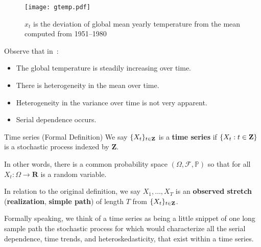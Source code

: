 \begin{figure}[!ht]
    \centering
    \texttt{[image: gtemp.pdf]}
    \caption{$ x_t $ is the deviation of global mean
        yearly temperature from the mean computed from 1951--1980}\label{fig:gtemp}
\end{figure}

Observe that in~:
\begin{itemize}
    \item The global temperature is steadily increasing over time.
    \item There is heterogeneity in the mean over time.
    \item Heterogeneity in the variance over time is not very apparent.
    \item Serial dependence occurs.
\end{itemize}

\begin{Definition}{Time series (Formal Definition)}{}
    We say $ \{X_t\}_{t\in\mathbf{Z}} $
    is a \textbf{time series} if $ \{X_t : t\in\mathbf{Z}\} $
    is a stochastic process indexed by $ \mathbf{Z} $.
\end{Definition}
In other words, there is a common probability space
$ (\Omega,\mathcal{F},\mathbb{P}) $ so that for all
$ X_t:\Omega\to\mathbf{R} $ is a random variable.

In relation to the original definition, we say
$ X_1,\ldots,X_T $ is an \textbf{observed stretch} (\textbf{realization},
\textbf{simple path}) of length $ T $ from $ \{X_t\}_{t\in\mathbf{Z}} $.

    {\color{blue}Formally speaking, we think of a time series as being a little snippet
        of one long sample path the stochastic process for which would characterize
        all the serial dependence, time trends, and heteroskedasticity,
        that exist within a time series.}

